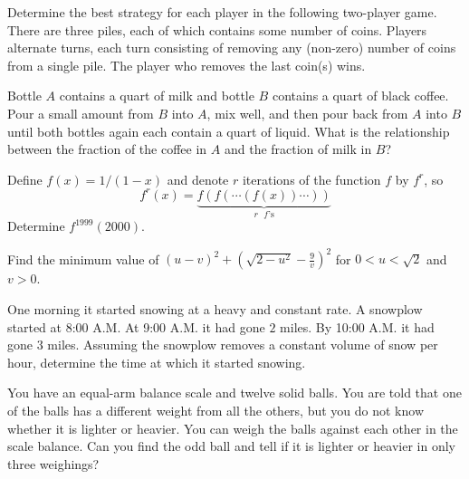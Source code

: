 \documentclass[12pt]{article}
\begin{document}
    \begin{exercise}
        Determine the best strategy for each player in the following two-player game. There are three piles, each of which contains some number of coins. Players alternate turns, each turn consisting of removing any (non-zero) number of coins from a single pile. The player who removes the last coin(s) wins.
    \end{exercise}

    \begin{exercise}
        Bottle $A$ contains a quart of milk and bottle $B$ contains a quart of black coffee. Pour a small amount from $B$ into $A$, mix well, and then pour back from $A$ into $B$ until both bottles again each contain a quart of liquid. What is the relationship between the fraction of the coffee in $A$ and the fraction of milk in $B$?
    \end{exercise}
        
    \begin{exercise}
        Define $f(x)=1/(1-x)$ and denote $r$ iterations of the function $f$ by $f^r$, so \[f^r(x)=\underbrace{f(f(\cdots(f(x))\cdots))}_{r\text{ $f$'s}} \] Determine $f^{1999}(2000)$.
    \end{exercise}
        
    \begin{exercise}
        Find the minimum value of $(u-v)^2+(\sqrt{2-u^2}-\frac{9}{v})^2$ for $0<u<\sqrt{2}$ and $v>0$.
    \end{exercise}
        
    \begin{exercise}
        One morning it started snowing at a heavy and constant rate. A snowplow started at 8:00 A.M. At 9:00 A.M. it had gone $2$ miles. By 10:00 A.M. it had gone $3$ miles. Assuming the snowplow removes a constant volume of snow per hour, determine the time at which it started snowing.
    \end{exercise}

    \begin{exercise}
        You have an equal-arm balance scale and twelve solid balls. You are told that one of the balls has a different weight from all the others, but you do not know whether it is lighter or heavier. You can weigh the balls against each other in the scale balance. Can you find the odd ball and tell if it is lighter or heavier in only three weighings?
    \end{exercise}
\end{document}
